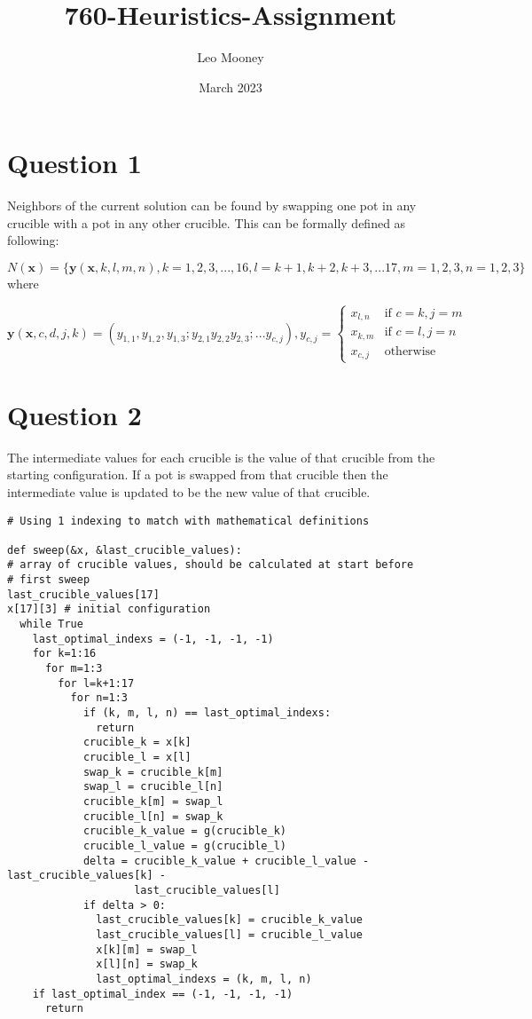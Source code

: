 \documentclass{article}
\title{760-Heuristics-Assignment}
\author{Leo Mooney}
\date{March 2023}
\begin{document}
\maketitle

\section{Question 1}
Neighbors of the current solution can be found by swapping one pot in
any crucible with a pot in any other crucible.
This can be formally defined as following:

$N(\mathbf{x}) = \{\mathbf{y}(\mathbf{x}, k, l, m, n), k=1,2,3,...,16, 
l=k+1,k+2,k+3,...17, m=1,2,3, n=1,2,3\}$ where

$$\mathbf{y}(\mathbf{x},c,d,j,k)=(y_{1, 1},y_{1, 2},y_{1, 3};
y_{2, 1}y_{2, 2}y_{2, 3};...y_{c, j}),y_{c,j}=
\begin{cases}
    x_{l, n} & \text{if } c=k,j=m \\
    x_{k, m} & \text{if } c=l,j=n \\
    x_{c,j} & \text{otherwise}
\end{cases}$$

\section{Question 2}
The intermediate values for each crucible is the value of that crucible
from the starting configuration. If a pot is swapped from that crucible
then the intermediate value is updated to be the new value of that
crucible.

\begin{verbatim}
# Using 1 indexing to match with mathematical definitions

def sweep(&x, &last_crucible_values):
# array of crucible values, should be calculated at start before 
# first sweep
last_crucible_values[17] 
x[17][3] # initial configuration
  while True 
    last_optimal_indexs = (-1, -1, -1, -1)
    for k=1:16
      for m=1:3
        for l=k+1:17
          for n=1:3
            if (k, m, l, n) == last_optimal_indexs:
              return
            crucible_k = x[k] 
            crucible_l = x[l] 
            swap_k = crucible_k[m]
            swap_l = crucible_l[n]
            crucible_k[m] = swap_l
            crucible_l[n] = swap_k
            crucible_k_value = g(crucible_k)
            crucible_l_value = g(crucible_l)
            delta = crucible_k_value + crucible_l_value - last_crucible_values[k] - 
                    last_crucible_values[l]
            if delta > 0:
              last_crucible_values[k] = crucible_k_value
              last_crucible_values[l] = crucible_l_value
              x[k][m] = swap_l
              x[l][n] = swap_k
              last_optimal_indexs = (k, m, l, n)
    if last_optimal_index == (-1, -1, -1, -1)
      return
          
\end{verbatim}
\end{document}
